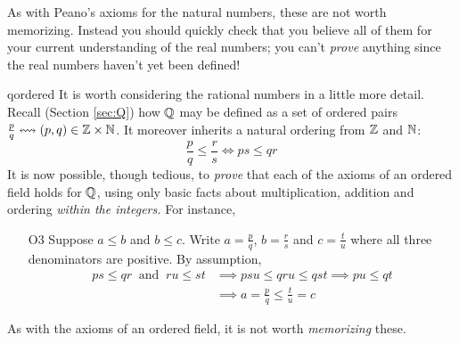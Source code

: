 As with Peano's axioms for the natural numbers, these are not worth memorizing. Instead you should quickly check that you believe all of them for your current understanding of the real numbers; you can't \emph{prove} anything since the real numbers haven't yet been defined!
\smallbreak


\begin{example}{}{qordered}
	It is worth considering the rational numbers in a little more detail. Recall (Section \ref{sec:Q}) how $\mathbb{Q}$ may be defined as a set of ordered pairs $\frac pq\leftrightsquigarrow(p,q)\in\mathbb{Z}\times \mathbb{N}$. It moreover inherits a natural ordering from $\mathbb{Z}$ and $\mathbb{N}$:
	\[\frac pq\le\frac rs\iff ps\le qr \tag{remember that $q,s>0$}\]
  It is now possible, though tedious, to \emph{prove} that each of the axioms of an ordered field holds for $\mathbb{Q}$, using only basic facts about multiplication, addition and ordering \emph{within the integers.} For instance,
  \begin{itemize}
		\item[O3] Suppose $a\le b$ and $b\le c$. Write $a=\frac pq$, $b=\frac rs$ and $c=\frac tu$ where all three denominators are positive. By assumption,
		\begin{align*}
			ps\le qr\ \text{ and }\ ru\le st &\implies psu\le qru\le qst\implies pu\le qt\\
			&\implies a=\frac pq\le\frac tu= c
		\end{align*}
	\end{itemize}
\end{example}


As with the axioms of an ordered field, it is not worth \emph{memorizing} these.

